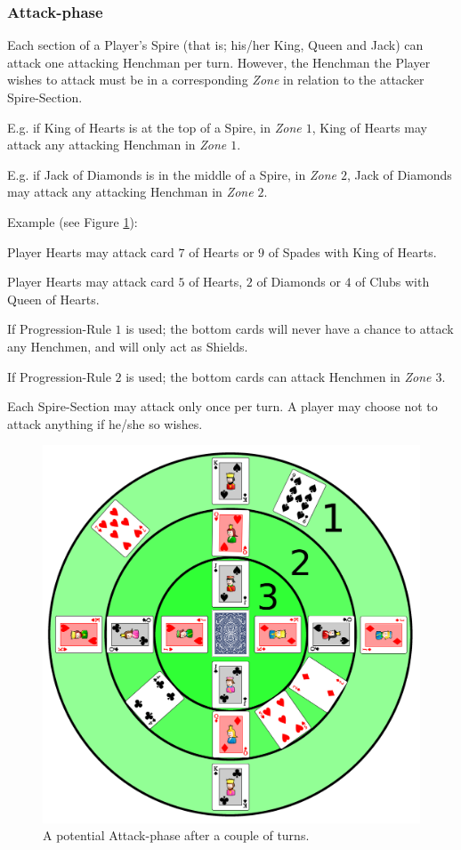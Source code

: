 \subsubsection{Attack-phase}
\label{sec:playingshufflespires_attackphase}
Each section of a Player's Spire (that is; his/her King, Queen and Jack) can attack one attacking Henchman per turn.
However, the Henchman the Player wishes to attack must be in a corresponding \textit{Zone} in relation to the attacker Spire-Section.

E.g. if King of Hearts is at the top of a Spire, in \textit{Zone $1$}, King of Hearts may attack any attacking Henchman in \textit{Zone $1$}.

E.g. if Jack of Diamonds is in the middle of a Spire, in \textit{Zone $2$}, Jack of Diamonds may attack any attacking Henchman in \textit{Zone $2$}.

Example (see Figure \ref{fig:attack}):

Player Hearts may attack card $7$ of Hearts or $9$ of Spades with King of Hearts.

Player Hearts may attack card $5$ of Hearts, $2$ of Diamonds or $4$ of Clubs with Queen of Hearts.

If Progression-Rule $1$ is used; the bottom cards will never have a chance to attack any Henchmen, and will only act as Shields.

If Progression-Rule $2$ is used; the bottom cards can attack Henchmen in \textit{Zone $3$}.

Each Spire-Section may attack only once per turn. A player may choose not to attack anything if he/she so wishes.

\begin{figure}[h!]
	\centering
	\includegraphics[width=\linewidth]{img/attack.png}
	\caption{A potential Attack-phase after a couple of turns.}
	\label{fig:attack}
\end{figure}


